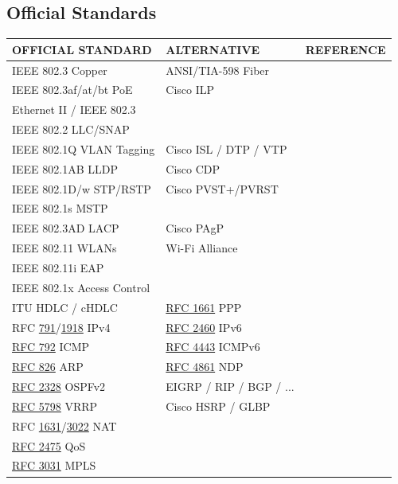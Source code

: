 \documentclass[12pt]{article}
\newcommand{\rfc}[1]{\href{https://datatracker.ietf.org/doc/html/rfc#1}{#1}}
\newcommand{\RFC}[1]{\href{https://datatracker.ietf.org/doc/html/rfc#1}{RFC #1}}
\begin{document}
	\subsection{Official Standards \label{subsec:STANDARDS}}
	\begin{table}[H]
	\centering
	\begin{tabular}{@{} l l r @{}}
	\textbf{OFFICIAL STANDARD}		& \textbf{ALTERNATIVE}		& \textbf{REFERENCE}\\\hline
	IEEE 802.3 Copper				& ANSI/TIA-598 Fiber		& \Cref{subsec:CABLING}\\
	IEEE 802.3af/at/bt PoE			& Cisco ILP				& \Cref{tab:POE}\\\hline
	Ethernet II / IEEE 802.3			&					& \Cref{subsec:802.3 ETHERNET}\\
	IEEE 802.2 LLC/SNAP			&					& \Cref{tab:802.2 LLC,tab:802.2 SNAP}\\
	IEEE 802.1Q VLAN Tagging		& Cisco ISL / DTP / VTP		& \Cref{subsec:VLAN TAGGING,subsec:CISCO VTP}\\
	IEEE 802.1AB LLDP			& Cisco CDP			& \Cref{subsec:CDP/802.1AB}\\
	IEEE 802.1D/w STP/RSTP			& Cisco PVST+/PVRST		& \Cref{subsec:802.1D/w}\\
	IEEE 802.1s MSTP				&					&\\
	IEEE 802.3AD LACP			& Cisco PAgP			&\\
	IEEE 802.11 WLANs			& Wi-Fi Alliance			& \Cref{subsec:802.11 WLANS}\\
	IEEE 802.11i EAP				&					& \Cref{fig:WIRELESS SECURITY}\\
	IEEE 802.1x Access Control		&					& \Cref{fig:WIRELESS SECURITY}\\
	ITU HDLC / cHDLC			& \RFC{1661} PPP			& \Cref{subsec:ITU HDLC,subsec:IETF PPP}\\\hline
	RFC \rfc{791}/\rfc{1918} IPv4		& \RFC{2460} IPv6		& \Cref{subsec:IPV4,subsec:IPV6}\\
	\RFC{792} ICMP				& \RFC{4443} ICMPv6		& \Cref{subsec:ICMP}\\
	\RFC{826} ARP				& \RFC{4861} NDP		& \Cref{subsec:ARP,subsec:NDP}\\
	\RFC{2328} OSPFv2			& EIGRP / RIP / BGP / ...		& \Cref{subsec:OSPF}\\
	\RFC{5798} VRRP				& Cisco HSRP / GLBP		&\\
	RFC \rfc{1631}/\rfc{3022} NAT		&					&\\
	\RFC{2475} QoS				&					& \Cref{sec:QOS}\\
	\RFC{3031} MPLS				&					& \Cref{sec:MPLS}\\\hline

\end{tabular}
\end{table}
\end{document}
